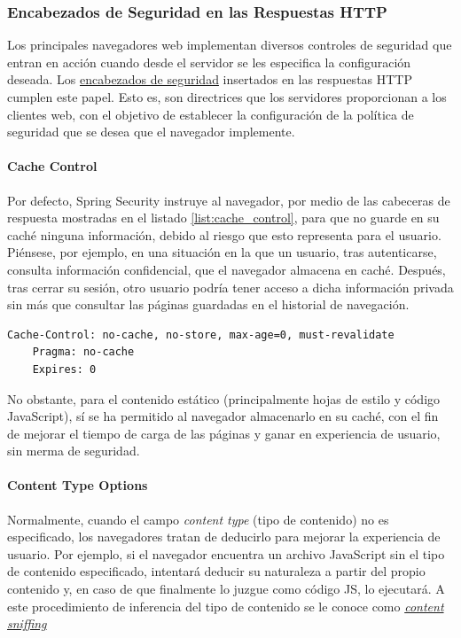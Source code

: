 \documentclass[a4paper]{article}
\begin{document}
	\subsubsection{Encabezados de Seguridad en las Respuestas HTTP}
	Los principales navegadores web implementan diversos controles de seguridad que entran en acción cuando desde el servidor se les especifica la configuración deseada. Los \href{https://owasp.org/www-project-secure-headers/}{encabezados de seguridad} insertados en las respuestas HTTP cumplen este papel. Esto es, son directrices que los servidores proporcionan a los clientes web, con el objetivo de establecer la configuración de la política de seguridad que se desea que el navegador implemente.
	
	\paragraph{Cache Control}
	Por defecto, Spring Security instruye al navegador, por medio de las cabeceras de respuesta mostradas en el listado \ref{list:cache_control}, para que no guarde en su caché ninguna información, debido al riesgo que esto representa para el usuario. Piénsese, por ejemplo, en una situación en la que un usuario, tras autenticarse, consulta información confidencial, que el navegador almacena en caché. Después, tras cerrar su sesión, otro usuario podría tener acceso a dicha información privada sin más que consultar las páginas guardadas en el historial de navegación.
	\\
	
	\begin{lstlisting}[caption=Cabeceras para impedir el almacenamiento en caché, label=list:cache_control]
	Cache-Control: no-cache, no-store, max-age=0, must-revalidate 
	Pragma: no-cache
	Expires: 0
	\end{lstlisting}
	
	No obstante, para el contenido estático (principalmente hojas de estilo y código JavaScript), sí se ha permitido al navegador almacenarlo en su caché, con el fin de mejorar el tiempo de carga de las páginas y ganar en experiencia de usuario, sin merma de seguridad.

	\paragraph{Content Type Options}
	Normalmente, cuando el campo \emph{content type} (tipo de contenido) no es especificado, los navegadores tratan de deducirlo para mejorar la experiencia de usuario. Por ejemplo, si el navegador encuentra un archivo JavaScript sin el tipo de contenido especificado, intentará deducir su naturaleza a partir del propio contenido y, en caso de que finalmente lo juzgue como código JS, lo ejecutará. A este procedimiento de inferencia del tipo de contenido se le conoce como \href{https://en.wikipedia.org/wiki/Content_sniffing}{\emph{content sniffing}}
	
\end{document}

